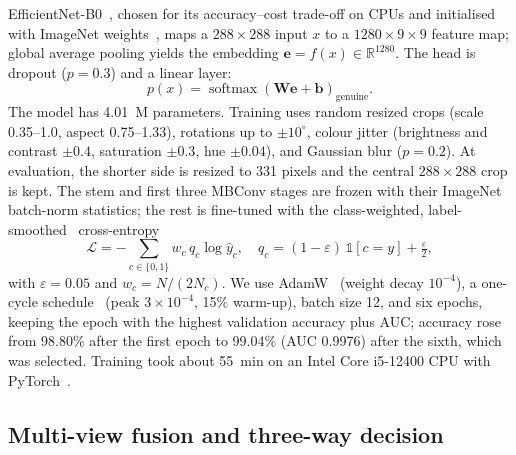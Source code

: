 \documentclass[pdflatex,sn-mathphys-num]{sn-jnl}
\begin{document}
EfficientNet-B0~\cite{tan2019efficientnet}, chosen for its accuracy--cost trade-off on
CPUs and initialised with ImageNet weights~\cite{deng2009imagenet}, maps a
$288\times288$ input $x$ to a $1280\times9\times9$ feature map; global average pooling
yields the embedding $\mathbf{e}=f(x)\in\mathbb{R}^{1280}$. The head is dropout
($p=0.3$) and a linear layer:
\begin{equation}
p(x) = \operatorname{softmax}\!\left(\mathbf{W}\mathbf{e}+\mathbf{b}\right)_{\text{genuine}} .
\label{eq:prob}
\end{equation}
The model has 4.01~M parameters. Training uses random resized crops (scale 0.35--1.0,
aspect 0.75--1.33), rotations up to $\pm10^\circ$, colour jitter (brightness and contrast
$\pm0.4$, saturation $\pm0.3$, hue $\pm0.04$), and Gaussian blur ($p=0.2$). At
evaluation, the shorter side is resized to 331 pixels and the central $288\times288$
crop is kept. The stem and first three MBConv stages are frozen with their ImageNet
batch-norm statistics; the rest is fine-tuned with the class-weighted,
label-smoothed~\cite{szegedy2016inception} cross-entropy
\begin{equation}
\mathcal{L} = -\sum_{c\in\{0,1\}} w_c\, q_c \log \hat{y}_c, \quad
q_c = (1-\varepsilon)\,\mathbb{1}[c=y] + \tfrac{\varepsilon}{2},
\label{eq:loss}
\end{equation}
with $\varepsilon=0.05$ and $w_c=N/(2N_c)$. We use AdamW~\cite{loshchilov2019adamw}
(weight decay $10^{-4}$), a one-cycle schedule~\cite{smith2019superconvergence} (peak
$3\times10^{-4}$, 15\% warm-up), batch size 12, and six epochs, keeping the epoch with
the highest validation accuracy plus AUC; accuracy rose from 98.80\% after the first
epoch to 99.04\% (AUC 0.9976) after the sixth, which was selected. Training took about
55~min on an Intel Core i5-12400 CPU with PyTorch~\cite{paszke2019pytorch}.

\subsection{Multi-view fusion and three-way decision}\label{sec:decision}
\end{document}
